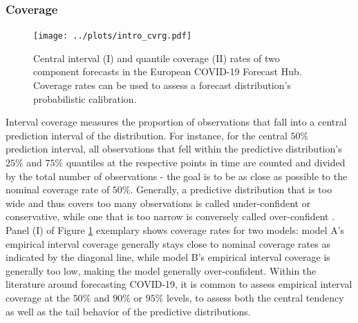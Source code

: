 \subsubsection{Coverage}
\begin{figure}
\centering
\texttt{[image: ../plots/intro\_cvrg.pdf]}
\caption{Central interval (I) and quantile coverage (II) rates of two component forecasts in the European COVID-19 Forecast Hub. Coverage rates can be used to assess a forecast distribution's probabilistic calibration. }
\label{fig:intro_cvg}
\end{figure}
Interval coverage measures the proportion of observations that fall into a central prediction interval of the distribution. For instance, for the central $50\%$ prediction interval, all observations that fell within the predictive distribution's $25\%$ and $75\%$ quantiles at the respective points in time are counted and divided by the total number of observations - the goal is to be as close as possible to the nominal coverage rate of $50\%$. Generally, a predictive distribution that is too wide and thus covers too many observations is called under-confident or conservative, while one that is too narrow is conversely called over-confident \cite{bosse_evaluating_2022}. Panel (I) of Figure \ref{fig:intro_cvg} exemplary shows coverage rates for two models: model A's empirical interval coverage generally stays close to nominal coverage rates as indicated by the diagonal line, while model B's empirical interval coverage is generally too low, making the model generally over-confident. %
Within the literature around forecasting COVID-19, it is common to assess empirical interval coverage at the $50\%$ and $90\%$ or $95\%$ levels, to assess both the central tendency as well as the tail behavior of the predictive distributions.\medskip\\%
